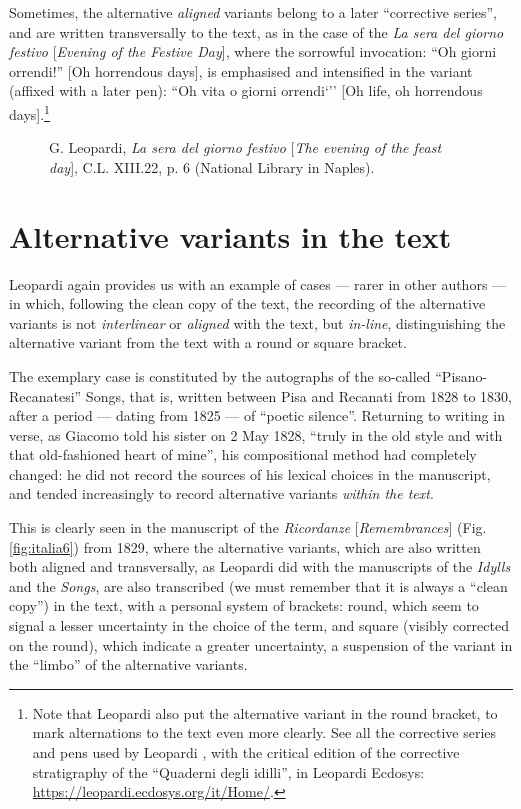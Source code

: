 \begin{paper}
\noindent Sometimes, the alternative \emph{aligned} variants belong to a later
``corrective series'', and are written transversally to the text, as in
the case of the \emph{La sera del giorno festivo} [\emph{Evening of the
Festive Day}], where the sorrowful invocation: ``Oh giorni orrendi!'' [Oh
horrendous days], is emphasised and intensified in the variant (affixed
with a later pen): ``Oh vita o giorni orrendi`'' [Oh life, oh horrendous
days].\footnote{Note that Leopardi also put the alternative variant in
  the round bracket, to mark alternations to the text even more
  clearly. See all the corrective series and pens used by Leopardi \parencite{giuffrida_print_2021}, with the critical edition of the
  corrective stratigraphy of the ``Quaderni degli idilli'', in Leopardi
  Ecdosys: \url{https://leopardi.ecdosys.org/it/Home/}.}

\begin{figure}[H]
    \centering
    \caption{G. Leopardi, \emph{La sera del giorno festivo} [\emph{The
evening of the feast day}], C.L. XIII.22, p. 6 (National Library in
Naples).}
    \label{fig:italia5}
\end{figure}

\section{Alternative variants in the text}

Leopardi again provides us with an example of cases –– rarer in other
authors –– in which, following the clean copy of the text, the recording
of the alternative variants is not \emph{interlinear} or \emph{aligned}
with the text, but \emph{in-line}, distinguishing the alternative
variant from the text with a round or square bracket.

The exemplary case is constituted by the autographs of the so-called
``Pisano-Recanatesi'' Songs, that is, written between Pisa and Recanati
from 1828 to 1830, after a period –– dating from 1825 –– of ``poetic
silence''. Returning to writing in verse, as Giacomo told his sister on 2
May 1828, ``truly in the old style and with that old-fashioned heart of
mine'', his compositional method had completely changed: he did not
record the sources of his lexical choices in the manuscript, and tended
increasingly to record alternative variants \emph{within the text}.

This is clearly seen in the manuscript of the \emph{Ricordanze}
[\emph{Remembrances}] (Fig. \ref{fig:italia6}) from 1829, where the alternative
variants, which are also written both aligned and transversally, as
Leopardi did with the manuscripts of the \emph{Idylls} and the
\emph{Songs}, are also transcribed (we must remember that it is always a
``clean copy'') in the text, with a personal system of brackets: round,
which seem to signal a lesser uncertainty in the choice of the term, and
square (visibly corrected on the round), which indicate a greater
uncertainty, a suspension of the variant in the ``limbo'' of the
alternative variants.


\end{paper}
